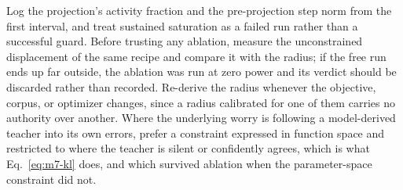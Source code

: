 Log the projection's activity fraction and the pre-projection step norm from the
first interval, and treat sustained saturation as a failed run rather than a
successful guard.
Before trusting any ablation, measure the unconstrained displacement of the same
recipe and compare it with the radius; if the free run ends up far outside, the
ablation was run at zero power and its verdict should be discarded rather than
recorded.
Re-derive the radius whenever the objective, corpus, or optimizer changes, since
a radius calibrated for one of them carries no authority over another.
Where the underlying worry is following a model-derived teacher into its own
errors, prefer a constraint expressed in function space and restricted to where
the teacher is silent or confidently agrees, which is what
Eq.~\ref{eq:m7-kl} does, and which survived ablation when the parameter-space
constraint did not.
